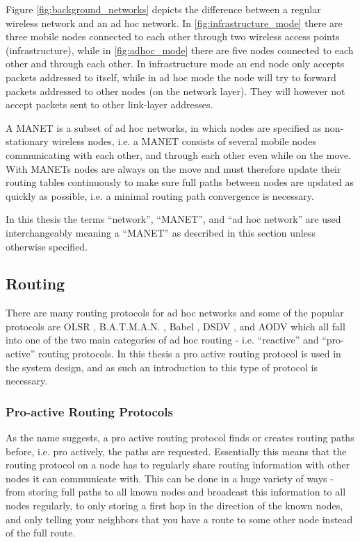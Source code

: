 Figure \ref{fig:background_networks} depicts the difference between a regular
wireless network and an ad hoc network. In \ref{fig:infrastructure_mode} there
are three mobile nodes connected to each other through two wireless access points
(infrastructure), while in \ref{fig:adhoc_mode} there are five nodes connected
to each other and through each other. In infrastructure mode an end node only
accepts packets addressed to itself, while in ad hoc mode the node will try to
forward packets addressed to other nodes (on the network layer). They will
however not accept packets sent to other link-layer addresses.

A \ac{MANET} is a subset of ad hoc networks, in which nodes are specified as
non-stationary wireless nodes, i.e. a \ac{MANET} consists of several mobile
nodes communicating with each other, and through each other even while on the
move. With \acp{MANET} nodes are always on the move and must therefore update
their routing tables continuously to make sure full paths between nodes are
updated as quickly as possible, i.e. a minimal routing path convergence is
necessary.

In this thesis the terms ``network'', ``\ac{MANET}'', and ``ad hoc network''
are used interchangeably meaning a ``\ac{MANET}'' as described in this section
unless otherwise specified.

\subsection{Routing}
There are many routing protocols for ad hoc networks and some of the popular
protocols are OLSR \cite{olsr_paper}, B.A.T.M.A.N. \cite{batman_rfc}, Babel
\cite{rfc6126}, DSDV \cite{he2002destination}, and AODV
\cite{Perkins:2003:AHO:RFC3561} which all fall into one of the two main
categories of ad hoc routing - i.e. ``reactive'' and ``pro-active'' routing
protocols. In this thesis a pro active routing protocol is used in the system
design, and as such an introduction to this type of protocol is necessary.

\subsubsection*{Pro-active Routing Protocols}
As the name suggests, a pro active routing protocol finds or creates routing
paths before, i.e. pro actively, the paths are requested. Essentially this means
that the routing protocol on a node has to regularly share routing information
with other nodes it can communicate with. This can be done in a huge variety of
ways - from storing full paths to all known nodes and broadcast this information
to all nodes regularly, to only storing a first hop in the direction of the
known nodes, and only telling your neighbors that you have a route to some other
node instead of the full route.

